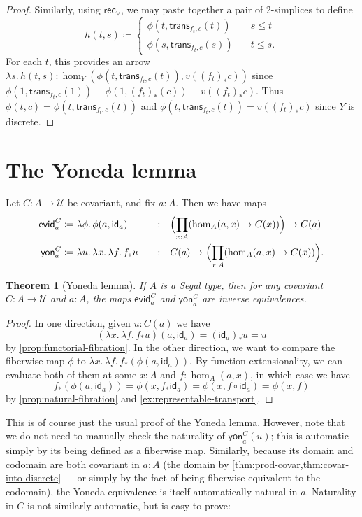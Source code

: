 \documentclass{amsart}
\theoremstyle{plain}
\newtheorem{thm}{Theorem}[section]
\theoremstyle{definition}
\theoremstyle{remark}
\numberwithin{equation}{section}
\newcommand{\jdeq}{\equiv}
\newcommand{\defeq}{\coloneqq}
\newcommand{\univtype}{\mathcal{U}}
\newcommand{\rec}{\mathsf{rec}}
\newcommand{\evid}{\mathsf{evid}}
\newcommand{\yon}{\mathsf{yon}}
\newcommand{\lam}[1]{\lambda #1.\,}
\newcommand{\idarr}[1]{\mathsf{id}_{#1}}
\newcommand{\covtr}[1]{{#1}_*}  %
\newcommand{\istrans}[2]{\mathsf{trans}_{#1,#2}}
\newcommand{\Parens}[1]{\Bigl(#1\Bigr)}
\begin{document}
\begin{proof}
Similarly, using $\rec_\lor$, we may paste  together a pair of 2-simplices to define
  \[
  h(t,s) \defeq
  \begin{cases}
    \phi(t,\istrans{f_t}{c}(t)) &\quad s \le t \\
    \phi(s,\istrans{f_t}{c}(s)) &\quad t \le s.
  \end{cases}
  \]
For each $t$, this provides an arrow $\lam{s} h(t,s) : \hom_Y( \phi(t,\istrans{f_t}{c}(t)) , v((f_t)_*c))$ since $    \phi(1,\istrans{f_t}{c}(1)) \jdeq \phi(1, (f_t)_*(c)) \jdeq v((f_t)_*c)$. Thus $\phi(t,c) =  \phi(t,\istrans{f_t}{c}(t))$ and $ \phi(t,\istrans{f_t}{c}(t)) =  v((f_t)_*c)$ since $Y$ is discrete.
\end{proof}


\section{The Yoneda lemma}
\label{sec:yoneda-lemma}

Let $C:A\to \univtype$ be covariant, and fix $a:A$.
Then we have maps
\begin{alignat*}{2}
  \evid^C_a &\defeq \lam{\phi}\phi(a,\idarr a) &\quad:\quad& \Parens{\prod_{x:A} (\hom_A(a,x) \to C(x))} \to C(a)\\
  \yon^C_a &\defeq \lam{u} \lam{x}\lam{f} \covtr f u &\quad:\quad& C(a) \to \Parens{\prod_{x:A} (\hom_A(a,x) \to C(x))}.
\end{alignat*}

\begin{thm}[Yoneda lemma]\label{thm:yoneda}
  If $A$ is a Segal type, then for any covariant $C:A\to \univtype$ and $a : A$, the maps $\evid^C_a$ and $\yon^C_a$ are inverse equivalences.
\end{thm}
\begin{proof}
In one direction, given $u : C(a)$ we have
\[ (\lam{x}\lam{f} \covtr f u)(a,\idarr a) = \covtr {(\idarr a)}u = u\] by \cref{prop:functorial-fibration}. 
In the other direction, we want to compare the fiberwise map $\phi$ to $\lam{x}\lam{f} \covtr f (\phi(a,\idarr a))$.
By function extensionality, we can evaluate both of them at some $x:A$ and $f:\hom_A(a,x)$, in which case we have
\[ \covtr f (\phi(a,\idarr a)) = \phi(x,\covtr f \idarr a) = \phi(x,f \circ \idarr a) = \phi(x,f) \]
by \cref{prop:natural-fibration} and \cref{ex:representable-transport}.
\end{proof}

This is of course just the usual proof of the Yoneda lemma.
However, note that we do not need to manually check the naturality of $\yon_a^C(u)$; this is automatic simply by its being defined as a fiberwise map.
Similarly, because its domain and codomain are both covariant in $a:A$ (the domain by \cref{thm:prod-covar,thm:covar-into-discrete} --- or simply by the fact of being fiberwise equivalent to the codomain), the Yoneda equivalence is itself automatically natural in $a$.
Naturality in $C$ is not similarly automatic, but is easy to prove:
\end{document}
